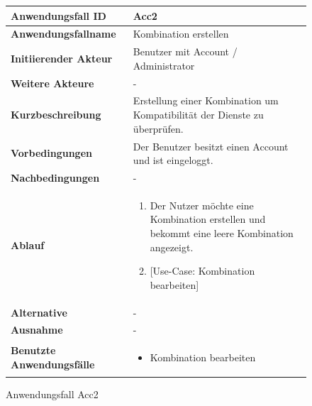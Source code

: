 \begin{figure}[h]
	\centering
	\begin{tabularx}{\textwidth}{ X | X }
		\textbf{Anwendungsfall ID} & Acc2 \\ \hline
		\textbf{Anwendungsfallname} & Kombination erstellen \\ \hline
		\textbf{Initiierender Akteur} & Benutzer mit Account / Administrator \\ \hline
		\textbf{Weitere Akteure} & -  \\ \hline
		\textbf{Kurzbeschreibung} & Erstellung einer Kombination um Kompatibilität der Dienste zu überprüfen.  \\ \hline
		\textbf{Vorbedingungen} & Der Benutzer besitzt einen Account und ist eingeloggt.  \\ \hline
		\textbf{Nachbedingungen} & -  \\ \hline
		\textbf{Ablauf} &
		\begin{enumerate}
			\item Der Nutzer möchte eine Kombination erstellen und bekommt eine leere Kombination angezeigt.
			\item {[Use-Case: Kombination bearbeiten]}
		\end{enumerate} \\ \hline
		\textbf{Alternative} &
			- \\ \hline
		\textbf{Ausnahme} &
      -  \\ \hline
		\textbf{Benutzte Anwendungsfälle} &
      \begin{itemize}
        \item Kombination bearbeiten
      \end{itemize} \\ \hline
	\end{tabularx}
	\caption{Anwendungsfall Acc2}
	\label{fig:anwendungsfall-server-tabelle-xx-1}
\end{figure}

